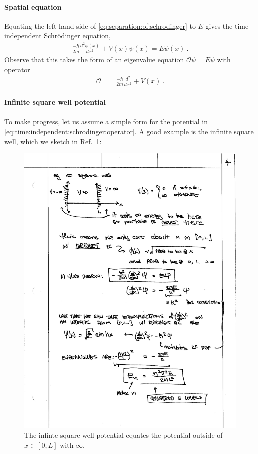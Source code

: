 \documentclass[12pt, oneside]{report}    %
\begin{document}
\paragraph{Spatial equation} Equating the left-hand side of \eqref{eq:separation:of:schrodinger} to $E$ gives the time-independent Schr\"odinger equation,
\begin{align}
    \frac{-\hbar}{2m}\frac{d^2\psi(x)}{dx^2} + V(x)\psi(x) = E\psi(x) \ .
\end{align}
Observe that this takes the form of an eigenvalue equation $\mathcal O \psi = E \psi$ with operator
\begin{align}
    \mathcal O &= \frac{-\hbar}{2m}\frac{d^2}{dx^2} + V(x)
    \label{eq:time:independent:schrodinger:operator} \ .
\end{align}

\paragraph{Infinite square well potential} To make progress, let us assume a simple form for the potential in \eqref{eq:time:independent:schrodinger:operator}. 
A good example is the infinite square well, which we sketch in Ref.~\ref{fig:inf:well}:
\begin{figure}[tb]
    \centering
    \includegraphics[width=.8\textwidth]{figures/inf_sq_well.pdf}
    \caption{The infinte square well potential equates the potential outside of $x\in[0,L]$ with $\infty$.}
    \label{fig:inf:well}
\end{figure}
\end{document}
